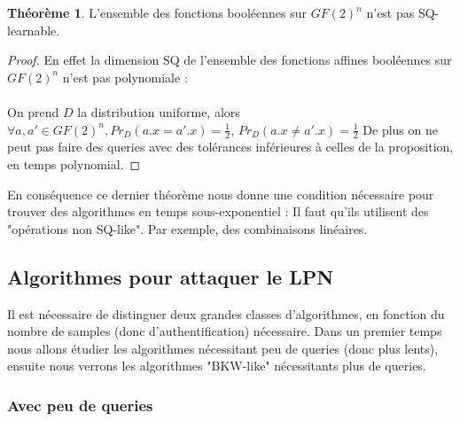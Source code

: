 \documentclass{article}		%
\theoremstyle{definition}
\newtheorem{theo}{Théorème}
\theoremstyle{plain}
\theoremstyle{plain}
\theoremstyle{plain}
\theoremstyle{plain}
\theoremstyle{plain}
\begin{document}
\begin{theo}
L'ensemble des fonctions booléennes sur $GF(2)^n$ n'est pas
SQ-learnable.
\end{theo}
\begin{proof}
En effet la dimension SQ de l'ensemble des fonctions affines booléennes sur
$GF(2)^n$ n'est pas polynomiale :
\\\\
On prend $D$ la distribution uniforme, alors 
$\forall a, a'\in GF(2)^n,
Pr_D(a.x=a'.x)=\frac{1}{2}$, $Pr_D(a.x\not=a'.x)=\frac{1}{2}$
 De plus on ne peut pas faire des queries avec
des tolérances inférieures à celles de la proposition, en temps
polynomial.
\end{proof}
En conséquence ce dernier théorème nous donne une condition nécessaire
pour trouver des algorithmes en temps sous-exponentiel : Il faut qu'ils
utilisent des "opérations non SQ-like". Par exemple, des combinaisons
linéaires.

\subsection{Algorithmes pour attaquer le LPN}
Il est nécessaire de distinguer deux grandes classes
d'algorithmes, en fonction du nombre de samples (donc d'authentification)
nécessaire. Dans un premier temps nous allons étudier les algorithmes
nécessitant peu de queries (donc plus lents), ensuite nous verrons
les algorithmes "BKW-like" nécessitants plus de queries.


\subsubsection{Avec peu de queries}
\end{document}
